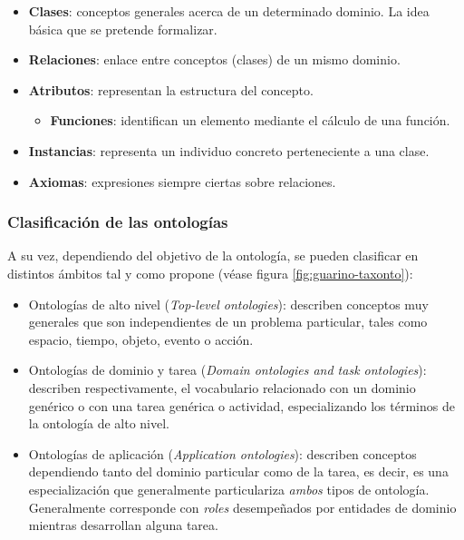 \begin{itemize}
\item \textbf{Clases}: conceptos generales acerca de un determinado dominio. La
  idea básica que se pretende formalizar. 
\item \textbf{Relaciones}: enlace entre conceptos (clases) de un mismo
  dominio.
\item \textbf{Atributos}: representan la estructura del concepto. 
  \begin{itemize}
  \item \textbf{Funciones}: identifican un elemento mediante el cálculo de una
    función. 
  \end{itemize}
\item \textbf{Instancias}: representa un individuo concreto perteneciente a una
  clase. 
\item \textbf{Axiomas}: expresiones siempre ciertas sobre relaciones. 
\end{itemize}


\subsubsection{Clasificación de las ontologías}

A su vez, dependiendo del objetivo de la ontología, se pueden clasificar en
distintos ámbitos tal y como propone \cite{guarino_formal_1998} (véase figura \ref{fig:guarino-taxonto}): 

\begin{itemize}
\item Ontologías de alto nivel (\textit{Top-level ontologies}): describen conceptos muy generales que son
  independientes de un problema particular, tales como espacio, tiempo, objeto,
  evento o acción. 
\item Ontologías de dominio y tarea (\textit{Domain ontologies and task ontologies}): describen respectivamente,
  el vocabulario relacionado con un dominio genérico o con una tarea genérica o
  actividad, especializando los términos de la ontología de alto nivel.
\item Ontologías de aplicación (\textit{Application ontologies}): describen conceptos dependiendo tanto del
  dominio particular como de la tarea, es decir, es una especialización que
  generalmente particulariza \textit{ambos} tipos de ontología. Generalmente
  corresponde con \textit{roles} desempeñados por entidades de dominio mientras
  desarrollan alguna tarea.  
\end{itemize}
 

